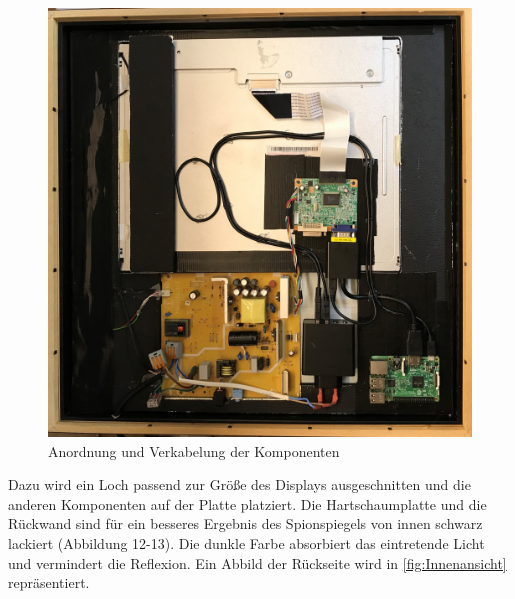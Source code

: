\begin{figure}
	\includegraphics[scale=0.06]{bilder/Innenansicht.jpg}
	\caption{Anordnung und Verkabelung der Komponenten}
	\label{fig:Innenansicht}
\end{figure}
Dazu wird ein Loch passend zur Größe des Displays ausgeschnitten und die anderen Komponenten auf der Platte platziert. Die Hartschaumplatte und die Rückwand sind für ein besseres Ergebnis des Spionspiegels von innen schwarz lackiert (Abbildung 12-13). 
Die dunkle Farbe absorbiert das eintretende Licht und vermindert die Reflexion. Ein Abbild der Rückseite wird in \autoref{fig:Innenansicht} repräsentiert.

